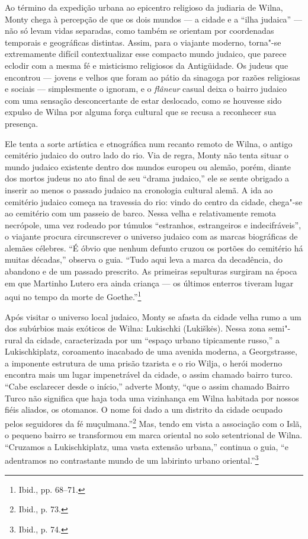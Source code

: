 Ao término da expedição urbana ao epicentro religioso da judiaria de
Wilna, Monty chega à percepção de que os dois mundos --- a cidade e a
``ilha judaica'' --- não só levam vidas separadas, como também se orientam
por coordenadas temporais e geográficas distintas. Assim, para o
viajante moderno, torna"-se extremamente difícil contextualizar esse
compacto mundo judaico, que parece eclodir com a mesma fé e misticismo
religiosos da Antigüidade. Os judeus que encontrou --- jovens e velhos que
foram ao pátio da sinagoga por razões religiosas e sociais ---
simplesmente o ignoram, e o \emph{flâneur} casual deixa o bairro judaico
com uma sensação desconcertante de estar deslocado, como se houvesse
sido expulso de Wilna por alguma força cultural que se recusa a
reconhecer sua presença.

Ele tenta a sorte artística e etnográfica num recanto remoto de Wilna, o
antigo cemitério judaico do outro lado do rio. Via de regra, Monty não
tenta situar o mundo judaico existente dentro dos mundos europeu ou
alemão, porém, diante dos mortos judeus no ato final de seu ``drama
judaico,'' ele se sente obrigado a inserir ao menos o passado judaico na
cronologia cultural alemã. A ida ao cemitério judaico começa na
travessia do rio: vindo do centro da cidade, chega"-se ao cemitério com
um passeio de barco. Nessa velha e relativamente remota necrópole, uma
vez rodeado por túmulos ``estranhos, estrangeiros e indecifráveis'', o
viajante procura circunscrever o universo judaico com as marcas
biográficas de alemães célebres. ``É óbvio que nenhum defunto cruzou os
portões do cemitério há muitas décadas,'' observa o guia. ``Tudo aqui
leva a marca da decadência, do abandono e de um passado prescrito. As
primeiras sepulturas surgiram na época em que Martinho Lutero era ainda
criança --- os últimos enterros tiveram lugar aqui no tempo da morte de
Goethe.''\footnote{Ibid., pp. 68--71.}

%

Após visitar o universo local judaico, Monty se afasta da cidade velha
rumo a um dos subúrbios mais exóticos de Wilna: Lukischki (Lukiškės).
Nessa zona semi"-rural da cidade, caracterizada por um ``espaço urbano
tipicamente russo,'' a Lukischkiplatz, coroamento inacabado de uma
avenida moderna, a Georgstrasse, a imponente estrutura de uma prisão
tzarista e o rio Wilja, o herói moderno encontra mais um lugar
impenetrável da cidade, o assim chamado bairro turco. ``Cabe esclarecer
desde o início,'' adverte Monty, ``que o assim chamado Bairro Turco não
significa que haja toda uma vizinhança em Wilna habitada por nossos
fiéis aliados, os otomanos. O nome foi dado a um distrito da cidade
ocupado pelos seguidores da fé muçulmana.''\footnote{Ibid., p. 73.} Mas,
tendo em vista a associação com o Islã, o pequeno bairro se transformou
em marca oriental no solo setentrional de Wilna. ``Cruzamos a
Lukischkiplatz, uma vasta extensão urbana,'' continua o guia, ``e
adentramos no contrastante mundo de um labirinto urbano
oriental.''\footnote{Ibid., p. 74.}

